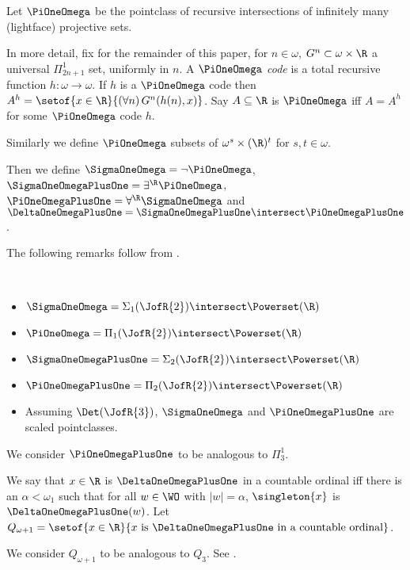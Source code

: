 \documentclass[oneside,12pt]{amsart}
\begin{document}
\begin{definition}
Let $\PiOneOmega$ be the pointclass of recursive intersections of infinitely many (lightface) projective sets.

In more detail, fix for the remainder of this paper, for $n\in\omega$, $G^n\subset\omega\times\R$
a universal $\Pi^1_{2n+1}$ set, uniformly in $n$.
A $\PiOneOmega$ \emph{code} is a total recursive function $h:\omega\to\omega$. If $h$ is a $\PiOneOmega$ code then
$A^h=\setof{x\in\R}{(\forall n)\, G^n(h(n),x)}$. Say $A\subseteq\R$ is $\PiOneOmega$ iff
$A=A^h$ for some $\PiOneOmega$ code $h$.

Similarly we define $\PiOneOmega$ subsets of $\omega^s\times(\R)^t$ for $s,t\in\omega$.

Then we define $\SigmaOneOmega = \neg\PiOneOmega$, $\SigmaOneOmegaPlusOne=\exists^{\R}\PiOneOmega$,
$\PiOneOmegaPlusOne = \forall^{\R}\SigmaOneOmega$ and
$\DeltaOneOmegaPlusOne = \SigmaOneOmegaPlusOne \intersect \PiOneOmegaPlusOne$.
\end{definition}

The following remarks follow from \cite{Scales_In_LofR}.
\begin{remarks} \
\begin{itemize}
\item $\SigmaOneOmega = \Sigma_1(\JofR{2}) \intersect \Powerset(\R)$
\item $\PiOneOmega = \Pi_1(\JofR{2}) \intersect \Powerset(\R)$
\item $\SigmaOneOmegaPlusOne = \Sigma_2(\JofR{2}) \intersect \Powerset(\R)$
\item $\PiOneOmegaPlusOne = \Pi_2(\JofR{2}) \intersect \Powerset(\R)$
\item Assuming $\Det(\JofR{3})$, $\SigmaOneOmega$ and $\PiOneOmegaPlusOne$
are scaled pointclasses.
\end{itemize}
\end{remarks}

We consider $\PiOneOmegaPlusOne$ to be analogous to $\Pi^1_3$.

\begin{definition}
We say that $x\in\R$ is $\DeltaOneOmegaPlusOne$ in a countable ordinal iff there is an $\alpha<\omega_1$ such
that for all $w\in\WO$ with $|w|=\alpha$, $\singleton{x}$ is $\DeltaOneOmegaPlusOne(w)$.
Let $Q_{\omega+1} = \setof{x\in\R}{x\text{ is }\DeltaOneOmegaPlusOne\text{ in a countable ordinal}}$.
\end{definition}

We consider $Q_{\omega+1}$ to be analogous to $Q_3$. See \cite{Q_Theory}.
\end{document}
